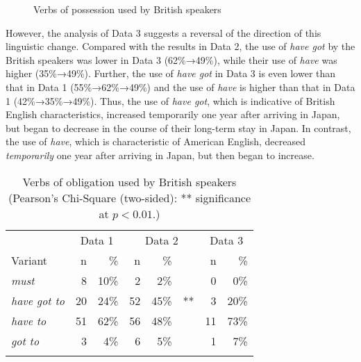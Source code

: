 \documentclass[output=paper,colorlinks,citecolor=brown]{langscibook}
\begin{document}
\begin{figure}
\caption{\label{fig:hirano:1}Verbs of possession used by British speakers}
\end{figure}

However, the analysis of Data 3 suggests a reversal of the direction of this linguistic change. Compared with the results in Data 2, the use of \textit{have got} by the British speakers was lower in Data 3 (62\%→49\%), while their use of \textit{have} was higher (35\%→49\%). Further, the use of \textit{have got} in Data 3 is even lower than that in Data 1 (55\%→62\%→49\%) and the use of \textit{have} is higher than that in Data 1 (42\%→35\%→49\%). Thus, the use of \textit{have got}, which is indicative of British English characteristics, increased temporarily one year after arriving in Japan, but began to decrease in the course of their long-term stay in Japan. In contrast, the use of \textit{have}, which is characteristic of American English, decreased \textit{temporarily} one year after arriving in Japan, but then began to increase.

\begin{table}
\begin{tabularx}{.66\textwidth}{X rr rr@{}l rr}
\lsptoprule
 & \multicolumn{2}{c}{Data 1} & \multicolumn{3}{c}{Data 2} & \multicolumn{2}{c}{Data 3}\\
\cmidrule(lr){2-3}
\cmidrule(lr){4-6}
\cmidrule(lr){7-8}
Variant              &  n &  \%    &  n &  \%    &    &  n &  \%\\\midrule
\textit{must}        &  8  &  10\% &  2  &  2\%  &    &  0 &  0\%\\
\textit{have got to} &  20 &  24\% &  52 &  45\% & ** &  3 &  20\%\\
\textit{have to}     &  51 &  62\% &  56 &  48\% &    &  11 &  73\%\\
\textit{got to}      &  3  &  4\%  &  6  &  5\%  &    &  1 &  7\%\\
\lspbottomrule
\end{tabularx}
\caption{Verbs of obligation used by British speakers (Pearson’s Chi-Square (two-sided): ** significance at $p < 0.01$.)}
\label{tab:hirano:4}
\end{table}
\end{document}
